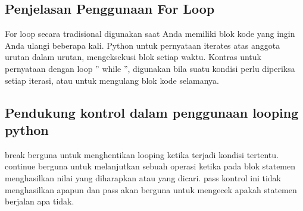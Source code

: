 \subsection{Penjelasan Penggunaan For Loop}
For loop secara tradisional digunakan saat Anda memiliki blok kode yang ingin Anda ulangi beberapa kali. Python untuk pernyataan iterates atas anggota urutan dalam urutan, mengeksekusi blok setiap waktu. Kontras untuk pernyataan dengan loop '' while '', digunakan bila suatu kondisi perlu diperiksa setiap iterasi, atau untuk mengulang blok kode selamanya.

\subsection{Pendukung kontrol dalam penggunaan looping python}
break berguna untuk menghentikan looping ketika terjadi kondisi tertentu.
continue berguna untuk melanjutkan sebuah operasi ketika pada blok statemen menghasilkan nilai yang diharapkan atau yang dicari.
pass kontrol ini tidak menghasilkan apapun dan pass akan berguna untuk mengecek apakah statemen berjalan apa tidak.
